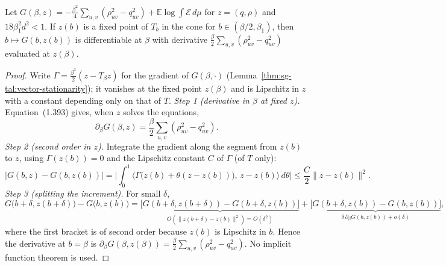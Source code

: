 \begin{theorem}[$\frac{d}{d\beta}G(\beta,z(\beta))=\frac\beta2\sum(\rho^2-q^2)$]\label{thm:sg-tal:vector-pressure-family}
\leanok
{}
Let $G(\beta,z)=-\frac{\beta^2}4\sum_{u,v}(\rho_{uv}^2-q_{uv}^2)+\mathbb E\log\int\mathcal E\,d\mu$ for $z=(q,\rho)$ and $18\beta_1^2d^2<1$. If $z(b)$ is a fixed point of $T_b$ in the cone for $b\in(\beta/2,\beta_1)$, then $b\mapsto G(b,z(b))$ is differentiable at $\beta$ with derivative $\frac\beta2\sum_{u,v}(\rho_{uv}^2-q_{uv}^2)$ evaluated at $z(\beta)$.
\end{theorem}
\begin{proof}
\leanok
Write $\Gamma=\frac{\beta^2}2(z-T_\beta z)$ for the gradient of $G(\beta,\cdot)$ (Lemma~\ref{thm:sg-tal:vector-stationarity}); it vanishes at the fixed point $z(\beta)$ and is Lipschitz in $z$ with a constant depending only on that of $T$.
\emph{Step 1 (derivative in $\beta$ at fixed $z$).} Equation~(1.393) gives, when $z$ solves the equations,
\[
\partial_\beta G(\beta,z)=\frac\beta2\sum_{u,v}(\rho_{uv}^2-q_{uv}^2).
\]
\emph{Step 2 (second order in $z$).} Integrate the gradient along the segment from $z(b)$ to $z$, using $\Gamma(z(b))=0$ and the Lipschitz constant $C$ of $\Gamma$ (of $T$ only):
\[
\big|G(b,z)-G(b,z(b))\big|=\Big|\int_0^1\big\langle\Gamma\big(z(b)+\theta(z-z(b))\big),\,z-z(b)\big\rangle\,d\theta\Big|\le\frac C2\|z-z(b)\|^2 .
\]
\emph{Step 3 (splitting the increment).} For small $\delta$,
\[
G\big(b+\delta,z(b+\delta)\big)-G\big(b,z(b)\big)=\underbrace{\big[G(b+\delta,z(b+\delta))-G(b+\delta,z(b))\big]}_{O(\|z(b+\delta)-z(b)\|^2)=O(\delta^2)}+\underbrace{\big[G(b+\delta,z(b))-G(b,z(b))\big]}_{\delta\,\partial_\beta G(b,z(b))+o(\delta)},
\]
where the first bracket is of second order because $z(b)$ is Lipschitz in $b$. Hence the derivative at $b=\beta$ is $\partial_\beta G(\beta,z(\beta))=\frac\beta2\sum_{u,v}(\rho_{uv}^2-q_{uv}^2)$. No implicit function theorem is used.
\end{proof}

